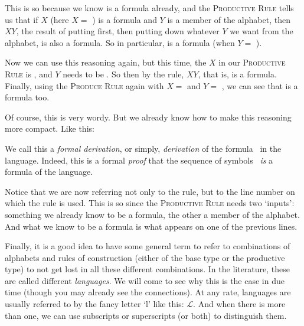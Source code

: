 This is so because we know \bbox{} is a formula already, and the \textsc{Productive Rule} tells us that if $X$ (here $X=$ \bbox) is a formula and $Y$ is a member of the alphabet, then $XY$, the result of putting \bbox{} first, then putting down whatever $Y$ we want from the alphabet, is also a formula. So in particular, \bbox\bcirc{} is a formula (when $Y=$ \bcirc).

Now we can use this reasoning again, but this time, the $X$ in our \textsc{Productive Rule} is \bbox\bcirc, and $Y$ needs to be \bbox. So then by the rule, $XY$, that is, \bbox\bcirc\bbox{} is a formula. Finally, using the \textsc{Produce Rule} again with $X=$ \bbox\bcirc\bbox{} and $Y=$ \btri{}, we can see that \bbox\bcirc\bbox\btri{} is a formula too. 

Of course, this is very wordy. But we already know how to make this reasoning more compact. Like this: 

\medskip
\begin{axiomatic}
\end{axiomatic}

\begin{remark}
We call this a \textit{formal derivation}, or simply, \textit{derivation} of the formula \bbox\bcirc\bbox\btri\ in the language. Indeed, this is a formal \textit{proof} that the sequence of symbols \bbox\bcirc\bbox\btri\ \textit{is} a formula of the language. 
\end{remark}

Notice that we are now referring not only to the rule, but to the line number on which the rule is used. This is so since the \textsc{Productive Rule} needs two `inputs': something we already know to be a formula, the other a member of the alphabet. And what we know to be a formula is what appears on one of the previous lines. 

Finally, it is a good idea to have some general term to refer to combinations of alphabets and rules of construction (either of the base type or the productive type) to not get lost in all these different combinations. In the literature, these are called different \textit{languages}. We will come to see why this is the case in due time (though you may already see the connections). At any rate, languages are usually referred to by the fancy letter `l' like this: $\mathcal{L}$. And when there is more than one, we can use subscripts or superscripts (or both) to distinguish them. 

